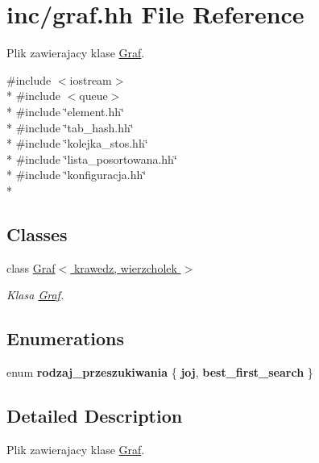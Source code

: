 \hypertarget{graf_8hh}{\section{inc/graf.hh File Reference}
\label{graf_8hh}
}


Plik zawierajacy klase \hyperlink{class_graf}{Graf}.  


{\ttfamily \#include $<$iostream$>$}\\*
{\ttfamily \#include $<$queue$>$}\\*
{\ttfamily \#include \char`\"{}element.\+hh\char`\"{}}\\*
{\ttfamily \#include \char`\"{}tab\+\_\+hash.\+hh\char`\"{}}\\*
{\ttfamily \#include \char`\"{}kolejka\+\_\+stos.\+hh\char`\"{}}\\*
{\ttfamily \#include \char`\"{}lista\+\_\+posortowana.\+hh\char`\"{}}\\*
{\ttfamily \#include \char`\"{}konfiguracja.\+hh\char`\"{}}\\*
\subsection*{Classes}
\begin{DoxyCompactItemize}
\item 
class \hyperlink{class_graf}{Graf$<$ krawedz, wierzcholek $>$}
\begin{DoxyCompactList}\small\item\em Klasa \hyperlink{class_graf}{Graf}. \end{DoxyCompactList}\end{DoxyCompactItemize}
\subsection*{Enumerations}
\begin{DoxyCompactItemize}
\item 
\hypertarget{graf_8hh_a21e872a06a76ee7bc1a0acb523f9fdee}{enum {\bfseries rodzaj\+\_\+przeszukiwania} \{ {\bfseries joj}, 
{\bfseries best\+\_\+first\+\_\+search}
 \}}\label{graf_8hh_a21e872a06a76ee7bc1a0acb523f9fdee}

\end{DoxyCompactItemize}


\subsection{Detailed Description}
Plik zawierajacy klase \hyperlink{class_graf}{Graf}. 

